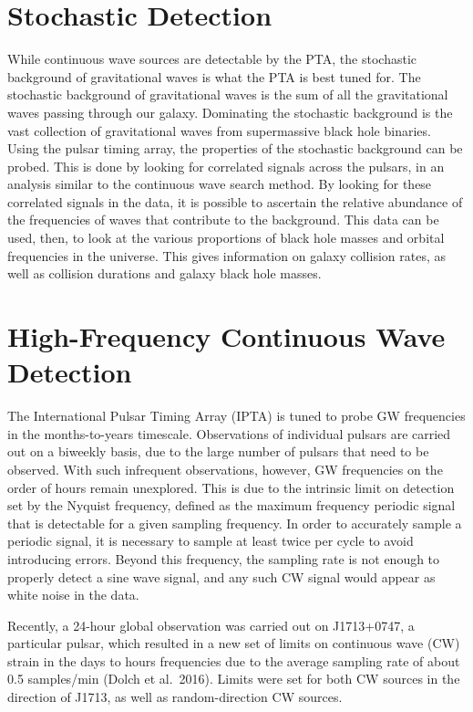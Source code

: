 \documentclass[12pt]{article}
\begin{document}
\section{Stochastic Detection}
While continuous wave sources are detectable by the PTA, the stochastic
background of gravitational waves is what the PTA is best tuned for. The
stochastic background of gravitational waves is the sum of all the gravitational
waves passing through our galaxy. Dominating the stochastic background is the
vast collection of gravitational waves from supermassive black hole binaries.
Using the pulsar timing array, the properties of the stochastic background can
be probed. This is done by looking for correlated signals across the pulsars, in
an analysis similar to the continuous wave search method. By looking for these
correlated signals in the data, it is possible to ascertain the relative
abundance of the frequencies of waves that contribute to the background. This
data can be used, then, to look at the various proportions of black hole masses
and orbital frequencies in the universe. This gives information on galaxy
collision rates, as well as collision durations and galaxy black hole masses.

\section{High-Frequency Continuous Wave Detection}

The International Pulsar Timing Array (IPTA) is tuned to probe GW
frequencies in the months-to-years timescale. Observations of individual pulsars
are carried out on a biweekly basis, due to the large number of pulsars that need
to be observed. With such infrequent observations, however, GW frequencies on
the
order of hours remain unexplored. This is due to the intrinsic limit on
detection set by the Nyquist frequency, defined as the maximum frequency
periodic signal that is detectable for a given sampling frequency. In order to
accurately sample a periodic signal, it is necessary to sample at least twice
per cycle to avoid introducing errors. Beyond
this frequency, the sampling rate is not enough to properly detect a sine wave
signal, and any such CW signal would appear as white noise in the data.

Recently, a 24-hour global observation was carried out on J1713+0747, a particular pulsar, which
resulted in a new set of limits on continuous wave (CW) strain in the days to
hours frequencies due to the average sampling rate of about 0.5 samples/min (Dolch et al.~2016).
Limits were set for both CW sources in the direction of J1713, as well as
random-direction CW sources.
\end{document}
